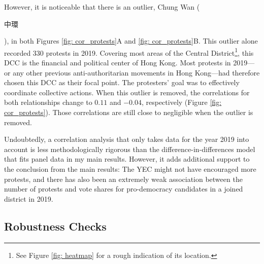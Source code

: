 \documentclass[letterpaper, 12pt]{article}
\begin{document}
However, it is noticeable that there is an outlier, Chung Wan (\begin{CJK*}{UTF8}{bkai}中環\end{CJK*}), in both Figures \ref{fig: cor_protests}A and \ref{fig: cor_protests}B. This outlier alone recorded 330 protests in 2019. Covering most areas of the Central District\footnote{See Figure \ref{fig: heatmap} for a rough indication of its location.}, this DCC is the financial and political center of Hong Kong. Most protests in 2019---or any other previous anti-authoritarian movements in Hong Kong---had therefore chosen this DCC as their focal point. The protesters' goal was to effectively coordinate collective actions. When this outlier is removed, the correlations for both relationships change to $0.11$ and $-0.04$, respectively (Figure \ref{fig: cor_protests}). Those correlations are still close to negligible when the outlier is removed. 

Undoubtedly, a correlation analysis that only takes data for the year 2019 into account is less methodologically rigorous than the difference-in-differences model that fits panel data in my main results. However, it adds additional support to the conclusion from the main results: The YEC might not have encouraged more protests, and there has also been an extremely weak association between the number of protests and vote shares for pro-democracy candidates in a joined district in 2019. 





\subsection{Robustness Checks}
\end{document}
